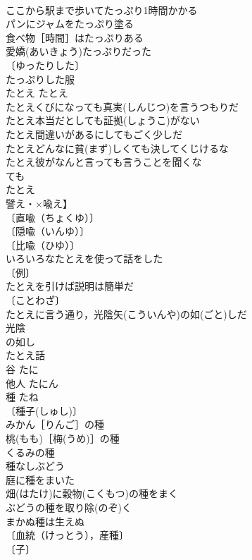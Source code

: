 \documentclass[8pt]{extreport}
\begin{document}
\begin{CJK}{UTF8}{min}
\\	ここから駅まで歩いてたっぷり1時間かかる 
\\	パンにジャムをたっぷり塗る 
\\	食べ物［時間］はたっぷりある 
\\	愛嬌(あいきょう)たっぷりだった 
\\	〔ゆったりした〕
\\	たっぷりした服 
\\	たとえ	たとえ	
\\	たとえくびになっても真実(しんじつ)を言うつもりだ 
\\	たとえ本当だとしても証拠(しょうこ)がない 
\\	たとえ間違いがあるにしてもごく少しだ 
\\	たとえどんなに貧(まず)しくても決してくじけるな 
\\	たとえ彼がなんと言っても言うことを聞くな 
\\	ても　
\\	たとえ
\\	譬え・×喩え】 
\\	〔直喩（ちょくゆ）〕
\\	〔隠喩（いんゆ）〕
\\	〔比喩（ひゆ）〕
\\	いろいろなたとえを使って話をした 
\\	〔例〕
\\	たとえを引けば説明は簡単だ 
\\	〔ことわざ〕
\\	たとえに言う通り，光陰矢(こういんや)の如(ごと)しだ 
\\	光陰 
\\	の如し　
\\	たとえ話 
\\	谷	たに	
\\	他人	たにん	
\\	種	たね	
\\	〔種子(しゅし)〕
\\	みかん［りんご］の種 
\\	桃(もも)［梅(うめ)］の種 
\\	くるみの種 
\\	種なしぶどう 
\\	庭に種をまいた 
\\	畑(はたけ)に穀物(こくもつ)の種をまく 
\\	ぶどうの種を取り除(のぞ)く 
\\	まかぬ種は生えぬ 
\\	〔血統（けっとう），産種〕
\\	〔子〕

\end{CJK}
\end{document}

